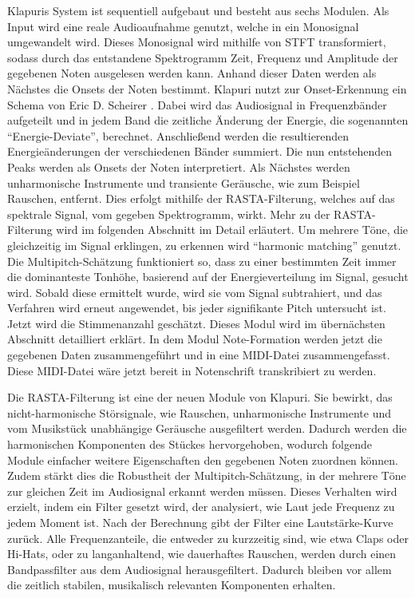 Klapuris System ist sequentiell aufgebaut und besteht aus sechs Modulen.
Als Input wird eine reale Audioaufnahme genutzt, welche in ein Monosignal umgewandelt wird.
Dieses Monosignal wird mithilfe von STFT transformiert,
sodass durch das entstandene Spektrogramm Zeit,
Frequenz und Amplitude der gegebenen Noten ausgelesen werden kann.
Anhand dieser Daten werden als Nächstes die Onsets der Noten bestimmt.
Klapuri nutzt zur Onset-Erkennung ein Schema von Eric D. Scheirer \cite{scheirer1998tempo}.
Dabei wird das Audiosignal in Frequenzbänder aufgeteilt und in jedem Band die zeitliche Änderung der Energie,
die sogenannten \enquote{Energie-Deviate}, berechnet.
Anschließend werden die resultierenden Energieänderungen der verschiedenen Bänder summiert.
Die nun entstehenden Peaks werden als Onsets der Noten interpretiert.
Als Nächstes werden unharmonische Instrumente und transiente Geräusche, wie zum Beispiel Rauschen, entfernt.
Dies erfolgt mithilfe der RASTA-Filterung, welches auf das spektrale Signal, vom gegeben Spektrogramm, wirkt.
Mehr zu der RASTA-Filterung wird im folgenden Abschnitt im Detail erläutert.
Um mehrere Töne, die gleichzeitig im Signal erklingen, zu erkennen wird \enquote{harmonic matching} genutzt.
Die Multipitch-Schätzung funktioniert so, dass zu einer bestimmten Zeit immer die dominanteste Tonhöhe,
basierend auf der Energieverteilung im Signal, gesucht wird.
Sobald diese ermittelt wurde, wird sie vom Signal subtrahiert,
und das Verfahren wird erneut angewendet, bis jeder signifikante Pitch untersucht ist.
Jetzt wird die Stimmenanzahl geschätzt.
Dieses Modul wird im übernächsten Abschnitt detailliert erklärt.
In dem Modul Note-Formation werden jetzt die gegebenen Daten zusammengeführt und in eine MIDI-Datei zusammengefasst.
Diese MIDI-Datei wäre jetzt bereit in Notenschrift transkribiert zu werden.

\begin{description}[style=nextline]
\item[RASTA-Filterung]\label{itm:rasta}
Die RASTA-Filterung ist eine der neuen Module von Klapuri.
Sie bewirkt, das nicht-harmonische Störsignale, wie
Rauschen, unharmonische Instrumente und vom Musikstück unabhängige Geräusche ausgefiltert werden.
Dadurch werden die harmonischen Komponenten des Stückes hervorgehoben,
wodurch folgende Module einfacher weitere Eigenschaften den gegebenen Noten zuordnen können.
Zudem stärkt dies die Robustheit der Multipitch-Schätzung,
in der mehrere Töne zur gleichen Zeit im Audiosignal erkannt werden müssen.
Dieses Verhalten wird erzielt, indem ein Filter gesetzt wird,
der analysiert, wie Laut jede Frequenz zu jedem Moment ist.
Nach der Berechnung gibt der Filter eine Lautstärke-Kurve zurück.
Alle Frequenzanteile, die entweder zu kurzzeitig sind, wie etwa Claps oder Hi-Hats, oder zu langanhaltend,
wie dauerhaftes Rauschen, werden durch einen Bandpassfilter aus dem Audiosignal herausgefiltert.
Dadurch bleiben vor allem die zeitlich stabilen, musikalisch relevanten Komponenten erhalten.
\end{description}

